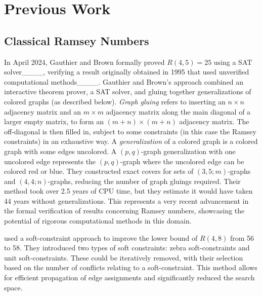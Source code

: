 \section{Previous Work}
\subsection{Classical Ramsey Numbers}

In April 2024, Gauthier and Brown formally proved $R(4, 5) = 25$ using a SAT solver____, verifying a result originally obtained in 1995 that used unverified computational methods____.
Gauthier and Brown's approach combined an interactive theorem prover, a SAT solver, and gluing together generalizations of colored graphs (as described below).
\emph{Graph gluing} refers to inserting an $n \times n$ adjacency matrix and an $m \times m$ adjacency matrix along the main diagonal of a larger empty matrix, to form an $(m+n) \times (m+n)$ adjacency matrix. 
The off-diagonal is then filled in, subject to some constraints (in this case the Ramsey constraints) in an exhaustive way.
A \emph{generalization} of a colored graph is a colored graph with some edges uncolored. 
A $(p,q)$-graph generalization with one uncolored edge represents the $(p,q)$-graph where the uncolored edge can be colored red or blue.
They constructed exact covers for sets of $(3, 5; m)$-graphs and $(4, 4; n)$-graphs, reducing the number of graph gluings required. 
Their method took over 2.5 years of CPU time, but they estimate it would have taken 44 years without generalizations. This represents a very recent advancement in the formal verification of results concerning Ramsey numbers, showcasing the potential of rigorous computational methods in this domain.

 used a soft-constraint approach to improve the lower bound of $R(4, 8)$ from 56 to 58. 
They introduced two types of soft constraints: zebra soft-constraints and unit soft-constraints. These could be iteratively removed, with their selection based on the number of conflicts relating to a soft-constraint.
This method allows for efficient propagation of edge assignments and significantly reduced the search space.

